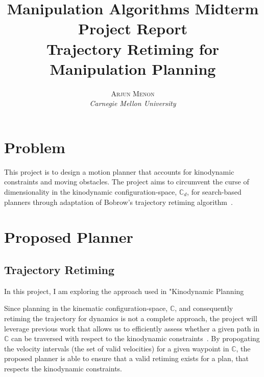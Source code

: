 \documentclass[letterpaper,10pt]{article} %
\title{\textbf{Manipulation Algorithms Midterm Project Report}\\ %
Trajectory Retiming for Manipulation Planning} %
\author{\textsc{Arjun Menon} %
\\{\textit{Carnegie Mellon University}}} %
\makeatletter
\renewcommand{\maketitle}{ %
\begin{flushright} %
{\LARGE\@title} %

\vspace{5pt} %

{\large\@author} %
\vspace{0pt} %
\end{flushright}
}
\makeatother
\begin{document}
\maketitle %



%
%
%


\section{Problem}

This project is to design a motion planner that accounts for kinodynamic constraints and moving obstacles. The project aims to circumvent the curse of dimensionality in the kinodynamic configuration-space, $\mathbb{C}_d$, for search-based planners through adaptation of Bobrow's trajectory retiming algorithm~\cite{bobrow1985time}.

\section{Proposed Planner}\label{sec:approach}

\subsection{Trajectory Retiming}\label{sec:constraints}

In this project, I am exploring the approach used in "Kinodynamic Planning 

Since planning in the kinematic configuration-space, $\mathbb{C}$, and consequently retiming the trajectory for dynamics is not a complete approach, the project will leverage previous work that allows us to efficiently assess whether a given path in $\mathbb{C}$ can be traversed with respect to the kinodynamic constraints~\cite{pham2013velocity}. By propogating the velocity intervals (the set of valid velocities) for a given waypoint in $\mathbb{C}$, the proposed planner is able to ensure that a valid retiming exists for a plan, that respects the kinodynamic constraints.
\end{document}
